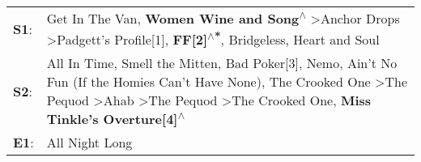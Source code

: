 \begin{supertabular}{p{0.03\textwidth}p{0.92\textwidth}}
 \textbf{S1}:  &                                                                                                                                                                                                    Get In The Van\textsuperscript{}, \enspace \textbf{Women Wine and Song\textsuperscript{$\wedge$}} \textgreater \enspace Anchor Drops\textsuperscript{} \textgreater \enspace Padgett's Profile[1]\textsuperscript{}, \enspace \textbf{FF[2]\textsuperscript{$\wedge$*}}, \enspace Bridgeless\textsuperscript{}, \enspace Heart and Soul\textsuperscript{}  \enspace  \\
 \textbf{S2}:  &  All In Time\textsuperscript{}, \enspace Smell the Mitten\textsuperscript{}, \enspace Bad Poker[3]\textsuperscript{}, \enspace Nemo\textsuperscript{}, \enspace Ain't No Fun (If the Homies Can't Have None)\textsuperscript{}, \enspace The Crooked One\textsuperscript{} \textgreater \enspace The Pequod\textsuperscript{} \textgreater \enspace Ahab\textsuperscript{} \textgreater \enspace The Pequod\textsuperscript{} \textgreater \enspace The Crooked One\textsuperscript{}, \enspace \textbf{Miss Tinkle's Overture[4]\textsuperscript{$\wedge$}}  \enspace  \\
 \textbf{E1}:  &                                                                                                                                                                                                                                                                                                                                                                                                                                                                                                                             All Night Long\textsuperscript{}  \enspace  \\
\end{supertabular}
